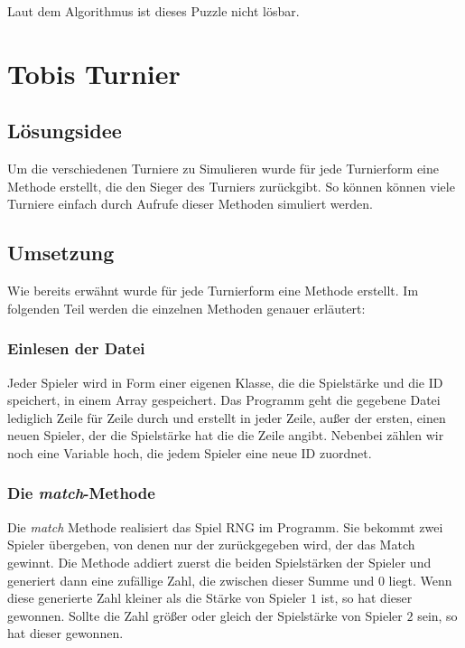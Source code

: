 \documentclass[a4paper, 12pt]{scrartcl}
\begin{document}
Laut dem Algorithmus ist dieses Puzzle nicht lösbar.

\section{Tobis Turnier}
\subsection{Lösungsidee}

Um die verschiedenen Turniere zu Simulieren wurde  für jede Turnierform eine Methode erstellt, die den Sieger des Turniers zurückgibt. So können können viele Turniere einfach durch Aufrufe dieser Methoden simuliert werden.

\subsection{Umsetzung}

Wie bereits erwähnt wurde für jede Turnierform eine Methode erstellt. Im folgenden Teil werden die einzelnen Methoden genauer erläutert:

\subsubsection{Einlesen der Datei}

Jeder Spieler wird in Form einer eigenen Klasse, die die Spielstärke und die ID speichert, in einem Array gespeichert. Das Programm geht die gegebene Datei lediglich Zeile für Zeile durch und erstellt in jeder Zeile, außer der ersten, einen neuen Spieler, der die Spielstärke hat die die Zeile angibt. Nebenbei zählen wir noch eine Variable hoch, die jedem Spieler eine neue ID zuordnet.

\subsubsection{Die \emph{match}-Methode}

Die \emph{match} Methode realisiert das Spiel RNG im Programm. Sie bekommt zwei Spieler übergeben, von denen nur der
zurückgegeben wird, der das Match gewinnt. Die Methode addiert zuerst die
beiden Spielstärken der Spieler und generiert dann eine zufällige Zahl, die
zwischen dieser Summe und $0$ liegt. Wenn diese generierte Zahl kleiner als die
Stärke von Spieler $1$ ist, so hat dieser gewonnen. Sollte die Zahl größer oder
gleich der Spielstärke von Spieler $2$ sein, so hat dieser gewonnen.
\end{document}
